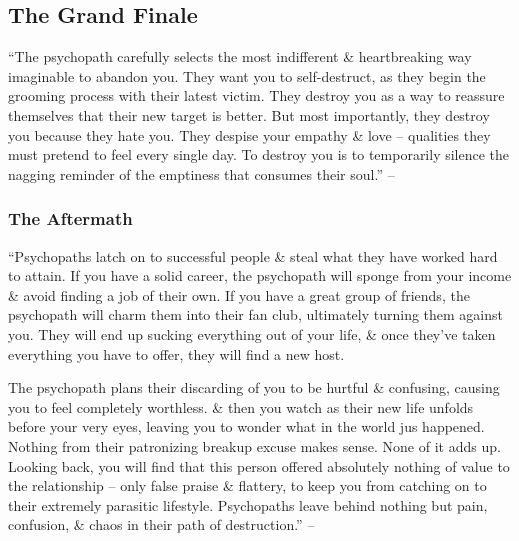 \documentclass{article}
\numberwithin{equation}{section}
\begin{document}
\subsection{The Grand Finale}
``The psychopath carefully selects the most indifferent \& heartbreaking way imaginable to abandon you. They want you to self-destruct, as they begin the grooming process with their latest victim. They destroy you as a way to reassure themselves that their new target is better. But most importantly, they destroy you because they hate you. They despise your empathy \& love -- qualities they must pretend to feel every single day. To destroy you is to temporarily silence the nagging reminder of the emptiness that consumes their soul.'' -- \cite[p. 71]{MacKenzie2015}

\subsubsection{The Aftermath}
``Psychopaths latch on to successful people \& steal what they have worked hard to attain. If you have a solid career, the psychopath will sponge from your income \& avoid finding a job of their own. If you have a great group of friends, the psychopath will charm them into their fan club, ultimately turning them against you. They will end up sucking everything out of your life, \& once they've taken everything you have to offer, they will find a new host.

The psychopath plans their discarding of you to be hurtful \& confusing, causing you to feel completely worthless. \& then you watch as their new life unfolds before your very eyes, leaving you to wonder what in the world jus happened. Nothing from their patronizing breakup excuse makes sense. None of it adds up. Looking back, you will find that this person offered absolutely nothing of value to the relationship -- only false praise \& flattery, to keep you from catching on to their extremely parasitic lifestyle. Psychopaths leave behind nothing but pain, confusion, \& chaos in their path of destruction.'' -- \cite[p. 71]{MacKenzie2015}
\end{document}
